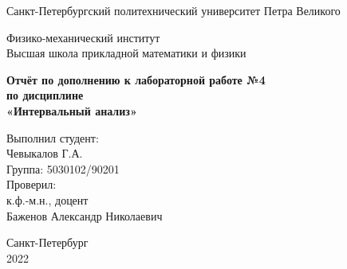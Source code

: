 \begin{titlepage}
	\newpage
	
	\begin{center}
		\textrm{\large Санкт-Петербургский политехнический университет \linebreak Петра Великого \\}
	\end{center}
	
	\begin{center}
			\textrm{\large Физико-механический институт \\ Высшая школа прикладной математики и физики \\}
	\end{center}

	\vspace{10em}
	
	\begin{center}
		\textrm{\textbf{\large Отчёт \linebreak по дополнению к лабораторной работе №4 \\
				по дисциплине \\ «Интервальный анализ»}}
	\end{center}
	
	\vspace{8em}
	
	\hfill\parbox{11cm}{
		\hspace*{4cm}Выполнил студент: \\
		\hspace*{4cm}Чевыкалов Г.А. \\
		\hspace*{4cm}Группа: 5030102/90201 \\
		\hspace*{4cm}Проверил: \\
		\hspace*{4cm}к.ф.-м.н., доцент \\
		\hspace*{4cm}Баженов Александр Николаевич \\
	}
	
	
	\vspace{\fill}
	
	\begin{center}
		Санкт-Петербург \\ 2022
	\end{center}
	
\end{titlepage}